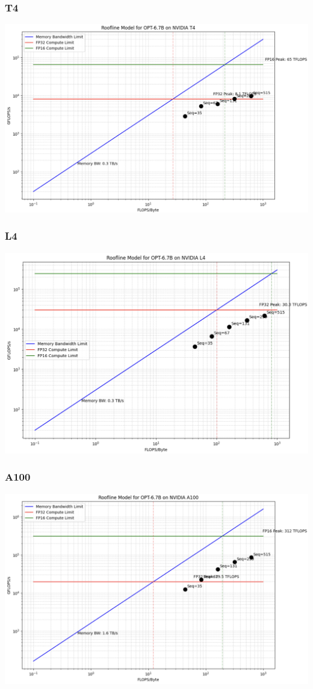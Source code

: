 \documentclass[11pt]{article}
\begin{document}
\subsubsection*{T4}
\includegraphics[width=14cm]{opt/opt_t4.png}
\subsubsection*{L4}
\includegraphics[width=14cm]{opt/opt_l4.png}
\subsubsection*{A100}
\includegraphics[width=14cm]{opt/opt_a100.png}
\end{document}
